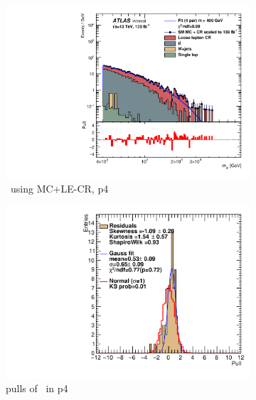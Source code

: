 \newpage

\begin{figure}[ht]
    \centering
    \begin{subfigure}[h]{0.38\linewidth}
    \includegraphics[scale=0.3]{figs/ch6/fit/variable_nosmooth/p4/01PB/output_SMMCplusCR_Mje_p4.pdf}%
    \caption{\mje \ using MC+LE-CR, p4}
    \end{subfigure}
    \hfill
    \begin{subfigure}[h]{0.4\linewidth}
    \includegraphics[scale=0.32]{figs/ch6/fit/variable_nosmooth/p4/01PB/pull_SMMCplusCR_Mje_p4.pdf}%
    \caption{pulls of \mje \ in p4}
    \end{subfigure}
    \hfill
    \begin{subfigure}[h]{0.38\linewidth}

\end{subfigure}
\end{figure}
